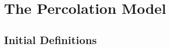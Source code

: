 \documentclass[a4paper,11pt]{article}
\theoremstyle{definition}
\begin{document}






	

\section{The Percolation Model}
\subsection{Initial Definitions}
\end{document}
